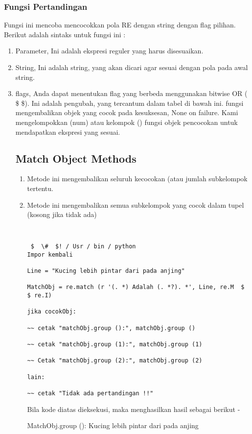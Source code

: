 \subsubsection{Fungsi Pertandingan}
Fungsi ini mencoba mencocokkan pola RE dengan string dengan flag pilihan.
Berikut adalah sintaks untuk fungsi ini :
\begin{enumerate}
\item Parameter, Ini adalah ekspresi reguler yang harus disesuaikan.
\item String, Ini adalah string, yang akan dicari agar sesuai dengan pola pada awal string.
\item flags, Anda dapat menentukan flag yang berbeda menggunakan bitwise OR ( \$ \$). Ini adalah pengubah, yang tercantum dalam tabel di bawah ini. fungsi mengembalikan objek yang cocok pada kesuksesan, None on failure. Kami mengelompokkan (num) atau kelompok () fungsi objek pencocokan untuk mendapatkan ekspresi yang sesuai.

\subsection{Match Object Methods}
\begin{enumerate}
\item Metode ini mengembalikan seluruh kecocokan (atau jumlah subkelompok tertentu.
\item Metode ini mengembalikan semua subkelompok yang cocok dalam tupel (kosong jika tidak ada)

\begin{verbatim}


 $  \#  $! / Usr / bin / python
Impor kembali

Line = "Kucing lebih pintar dari pada anjing"

MatchObj = re.match (r '(. *) Adalah (. *?). *', Line, re.M  $    $ re.I)

jika cocokObj:

~~ cetak "matchObj.group ():", matchObj.group ()

~~ cetak "matchObj.group (1):", matchObj.group (1)

~~ Cetak "matchObj.group (2):", matchObj.group (2)

lain:

~~ cetak "Tidak ada pertandingan !!"
\end{verbatim}

Bila kode diatas dieksekusi, maka menghasilkan hasil sebagai berikut -

MatchObj.group (): Kucing lebih pintar dari pada anjing


\end{enumerate}
\end{enumerate}
